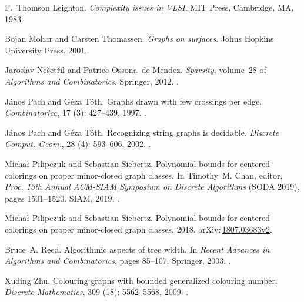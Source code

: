\documentclass{patmorin}
\newcommand{\arXiv}[1]{arXiv:\,\href{https://arxiv.org/abs/#1}{#1}}
\begin{document}
\begin{thebibliography}{37}
	F.~Thomson Leighton.
	\newblock \emph{Complexity issues in {VLSI}}.
	\newblock MIT Press, Cambridge, MA, 1983.
	
	Bojan Mohar and Carsten Thomassen.
	\newblock \emph{Graphs on surfaces}.
	\newblock Johns Hopkins University Press, 2001.
	
	Jaroslav Ne{\v{s}}et{\v{r}}il and Patrice Ossona~de Mendez.
	\newblock \emph{Sparsity}, volume~28 of \emph{Algorithms and Combinatorics}.
	\newblock Springer, 2012.
	\newblock {}.
	
	J{\'{a}}nos Pach and G{\'{e}}za T{\'{o}}th.
	\newblock Graphs drawn with few crossings per edge.
	\newblock \emph{Combinatorica}, 17 (3): 427--439, 1997.
	\newblock {}.
	
	J{\'a}nos Pach and G{\'e}za T{\'o}th.
	\newblock Recognizing string graphs is decidable.
	\newblock \emph{Discrete Comput. Geom.}, 28 (4): 593--606,
	2002.
	\newblock {}.
	
	Micha{\l} Pilipczuk and Sebastian Siebertz.
	\newblock Polynomial bounds for centered colorings on proper minor-closed graph classes.
	\newblock In Timothy~M. Chan, editor, \emph{Proc. 13th Annual {ACM-SIAM}
		Symposium on Discrete Algorithms} (SODA 2019), pages 1501--1520. {SIAM},	2019.
	\newblock {}.
	
	Michał Pilipczuk and Sebastian Siebertz.
	\newblock Polynomial bounds for centered colorings on proper minor-closed graph
	classes, 2018.
	\newblock \arXiv{1807.03683v2}.
	
	Bruce~A. Reed.
	\newblock Algorithmic aspects of tree width.
	\newblock In \emph{Recent Advances in Algorithms and Combinatorics}, pages 85--107. Springer, 2003.
	\newblock {}.
	
	
	Xuding Zhu.
	\newblock Colouring graphs with bounded generalized colouring number.
	\newblock \emph{Discrete Mathematics}, 309 (18): 5562--5568,
	2009.
	\newblock {}.
	
\end{thebibliography}
\end{document}
